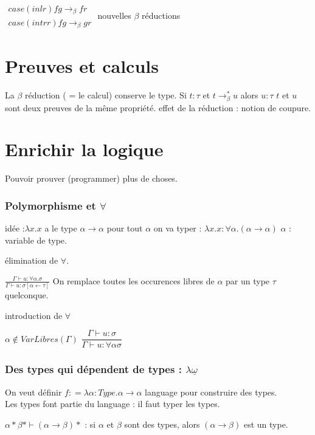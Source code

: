 \documentclass[10pt,a4paper]{article}
\begin{document}
$\begin{array}{l}
case (inl r) f g →_{\beta} f r\\
case (intr r) f g  →_{\beta} g r
\end{array}$ nouvelles $\beta$ réductions


\section{Preuves et calculs}
La $\beta$ réduction ( = le calcul) conserve le type.
Si $t : \tau$ et $t →^*_{\beta} u$ alors $u : \tau$
$t$ et $u$ sont deux preuves de la même propriété.
effet de la réduction : notion de coupure.

\section{Enrichir la logique}

Pouvoir prouver (programmer) plus de choses.

\subsubsection{Polymorphisme et $\forall$}

idée :$ \lambda x . x$ a le type $\alpha → \alpha$ pour tout $\alpha$
on va typer  : $\lambda x .x : \forall \alpha.( \alpha → \alpha) $
$\alpha$ : variable de type.

élimination de $\forall$.

$\frac{\Gamma \vdash u :\forall \alpha . \sigma}{\Gamma \vdash u :\sigma[ \alpha ← \tau]}$
On remplace toutes les occurences libres de $\alpha$ par un type $\tau$ quelconque.

introduction de $\forall$

$\alpha \not \in VarLibres(\Gamma)$
$\dfrac{\Gamma \vdash u : \sigma}{\Gamma \vdash u : \forall \alpha \sigma}$


\subsubsection{Des types qui dépendent de types : $\lambda \underline{\omega}$}
On veut définir $f : = \lambda \alpha : Type . \alpha → \alpha$ language pour construire des types.\\
Les types font partie du language : il faut typer les types.

$\alpha * \beta * \vdash (\alpha → \beta) *$ : si $\alpha$ et $\beta$ sont des types, alors $(\alpha → \beta)$ est un type.
\end{document}
